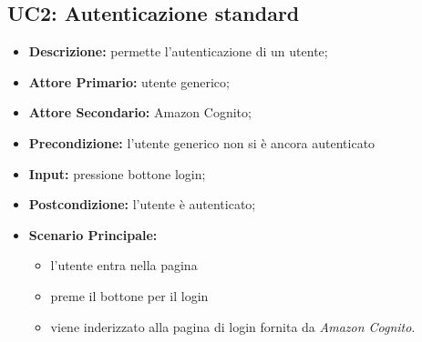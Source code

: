 \subsection{UC2: Autenticazione standard}
        \label{sec:UC2}
        \begin{itemize}
            \item \textbf{Descrizione:} permette l'autenticazione di un utente;
            \item \textbf{Attore Primario:} utente generico;
            \item \textbf{Attore Secondario:} Amazon Cognito;
            \item \textbf{Precondizione:} l'utente generico non si è ancora autenticato
            \item \textbf{Input:} pressione bottone login;
            \item \textbf{Postcondizione:} l'utente è autenticato;
            \item \textbf{Scenario Principale:} 
            \begin{itemize}
                \item l'utente entra nella pagina
                \item preme il bottone per il login
                \item viene inderizzato alla pagina di login fornita da \textit{Amazon Cognito}.
            \end{itemize}
        \end{itemize}